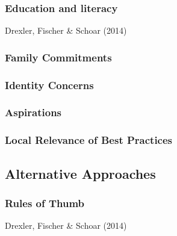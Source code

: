 \documentclass[hideothersubsections, usenames,dvipsnames,11pt]{beamer}
\newenvironment{itemize_2pt}{\itemize\addtolength{\itemsep}{2pt}}{\enditemize}
\begin{document}
\begin{frame}
\frametitle{Education and literacy}
	\begin{itemize_2pt}
	\item Drexler, Fischer \& Schoar (2014) \citep{Drexler2014}
	\vspace{0.1in}
	\end{itemize_2pt}
\end{frame}

\begin{frame}
\frametitle{Family Commitments}
	\begin{itemize_2pt}
	\item 
	\vspace{0.1in}
	\end{itemize_2pt}
\end{frame}

\begin{frame}
\frametitle{Identity Concerns}
	\begin{itemize_2pt}
	\item 
	\vspace{0.1in}
	\end{itemize_2pt}
\end{frame}

\begin{frame}
\frametitle{Aspirations}
	\begin{itemize_2pt}
	\item 
	\vspace{0.1in}
	\end{itemize_2pt}
\end{frame}

\begin{frame}
\frametitle{Local Relevance of Best Practices}
	\begin{itemize_2pt}
	\item 
	\vspace{0.1in}
	\end{itemize_2pt}
\end{frame}


\subsection{Alternative Approaches}

\begin{frame}
\frametitle{Rules of Thumb}
	\begin{itemize_2pt}
	\item Drexler, Fischer \& Schoar (2014) \citep{Drexler2014}
	\vspace{0.1in}
	\end{itemize_2pt}
\end{frame}
\end{document}
